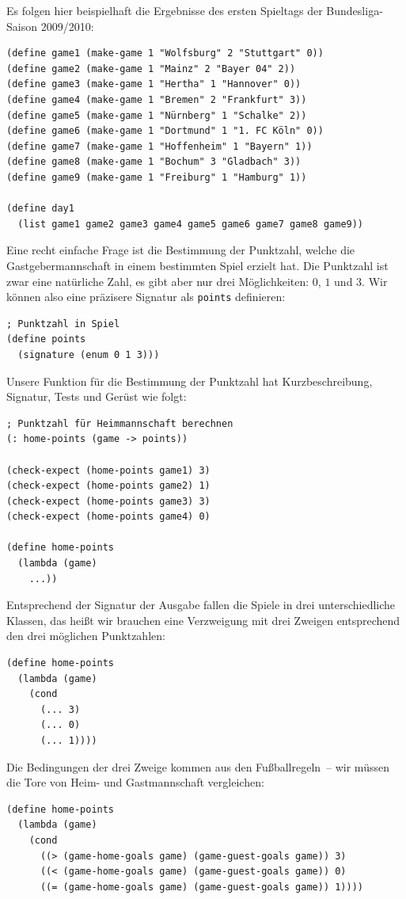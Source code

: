 Es folgen hier beispielhaft die Ergebnisse des ersten Spieltags der Bundesliga-Saison
2009/2010:
\begin{lstlisting}
(define game1 (make-game 1 "Wolfsburg" 2 "Stuttgart" 0))
(define game2 (make-game 1 "Mainz" 2 "Bayer 04" 2))
(define game3 (make-game 1 "Hertha" 1 "Hannover" 0))
(define game4 (make-game 1 "Bremen" 2 "Frankfurt" 3))
(define game5 (make-game 1 "Nürnberg" 1 "Schalke" 2))
(define game6 (make-game 1 "Dortmund" 1 "1. FC Köln" 0))
(define game7 (make-game 1 "Hoffenheim" 1 "Bayern" 1))
(define game8 (make-game 1 "Bochum" 3 "Gladbach" 3))
(define game9 (make-game 1 "Freiburg" 1 "Hamburg" 1))

(define day1
  (list game1 game2 game3 game4 game5 game6 game7 game8 game9))
\end{lstlisting}
%
Eine recht einfache Frage ist die Bestimmung der Punktzahl, welche die
Gastgebermannschaft in einem bestimmten Spiel erzielt hat.  Die
Punktzahl ist zwar eine natürliche Zahl, es gibt aber nur drei
Möglichkeiten: $0$, $1$ und $3$.  Wir können also eine präzisere Signatur
als \lstinline{points} definieren:
%
\begin{lstlisting}
; Punktzahl in Spiel
(define points
  (signature (enum 0 1 3)))
\end{lstlisting}
%
Unsere Funktion für die Bestimmung der Punktzahl hat Kurzbeschreibung,
Signatur, Tests und Gerüst wie folgt:
%
\begin{lstlisting}
; Punktzahl für Heimmannschaft berechnen
(: home-points (game -> points))

(check-expect (home-points game1) 3)
(check-expect (home-points game2) 1)
(check-expect (home-points game3) 3)
(check-expect (home-points game4) 0)

(define home-points
  (lambda (game)
    ...))
\end{lstlisting}
% 
Entsprechend der Signatur der Ausgabe fallen die Spiele in drei
unterschiedliche Klassen, das heißt wir brauchen eine Verzweigung mit
drei Zweigen entsprechend den drei möglichen Punktzahlen:
%
\begin{lstlisting}
(define home-points
  (lambda (game)
    (cond
      (... 3)
      (... 0)
      (... 1))))
\end{lstlisting}
%
Die Bedingungen der drei Zweige kommen aus den Fußballregeln~-- wir
müssen die Tore von Heim- und Gastmannschaft vergleichen:
%
\begin{lstlisting}
(define home-points
  (lambda (game)
    (cond
      ((> (game-home-goals game) (game-guest-goals game)) 3)
      ((< (game-home-goals game) (game-guest-goals game)) 0)
      ((= (game-home-goals game) (game-guest-goals game)) 1))))
\end{lstlisting}

